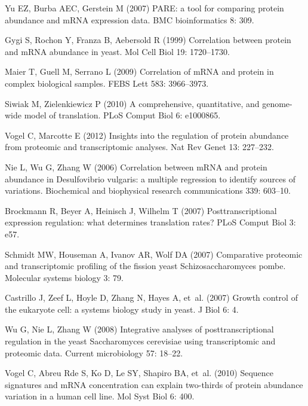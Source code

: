 \documentclass[10pt]{article}
\begin{document}
\begin{thebibliography}{10}
Yu EZ, Burba AEC, Gerstein M (2007) {PARE: a tool for comparing protein
  abundance and mRNA expression data.}
\newblock BMC bioinformatics 8: 309.

Gygi S, Rochon Y, Franza B, Aebersold R (1999) Correlation between protein and
  {mRNA} abundance in yeast.
\newblock Mol Cell Biol 19: 1720--1730.

Maier T, Guell M, Serrano L (2009) Correlation of {mRNA} and protein in complex
  biological samples.
\newblock FEBS Lett 583: 3966--3973.

Siwiak M, Zielenkiewicz P (2010) A comprehensive, quantitative, and genome-wide
  model of translation.
\newblock PLoS Comput Biol 6: e1000865.

Vogel C, Marcotte E (2012) Insights into the regulation of protein abundance
  from proteomic and transcriptomic analyses.
\newblock Nat Rev Genet 13: 227--232.

Nie L, Wu G, Zhang W (2006) {Correlation between mRNA and protein abundance in
  Desulfovibrio vulgaris: a multiple regression to identify sources of
  variations.}
\newblock Biochemical and biophysical research communications 339: 603--10.

Brockmann R, Beyer A, Heinisch J, Wilhelm T (2007) Posttranscriptional
  expression regulation: what determines translation rates?
\newblock PLoS Comput Biol 3: e57.

Schmidt MW, Houseman A, Ivanov AR, Wolf DA (2007) {Comparative proteomic and
  transcriptomic profiling of the fission yeast Schizosaccharomyces pombe.}
\newblock Molecular systems biology 3: 79.

Castrillo J, Zeef L, Hoyle D, Zhang N, Hayes A, et~al. (2007) Growth control of
  the eukaryote cell: a systems biology study in yeast.
\newblock J Biol 6: 4.

Wu G, Nie L, Zhang W (2008) {Integrative analyses of posttranscriptional
  regulation in the yeast Saccharomyces cerevisiae using transcriptomic and
  proteomic data.}
\newblock Current microbiology 57: 18--22.

Vogel C, {Abreu Rde} S, Ko D, Le SY, Shapiro BA, et~al. (2010) {Sequence
  signatures and mRNA concentration can explain two-thirds of protein abundance
  variation in a human cell line}.
\newblock Mol Syst Biol 6: 400.


\end{thebibliography}
\end{document}

